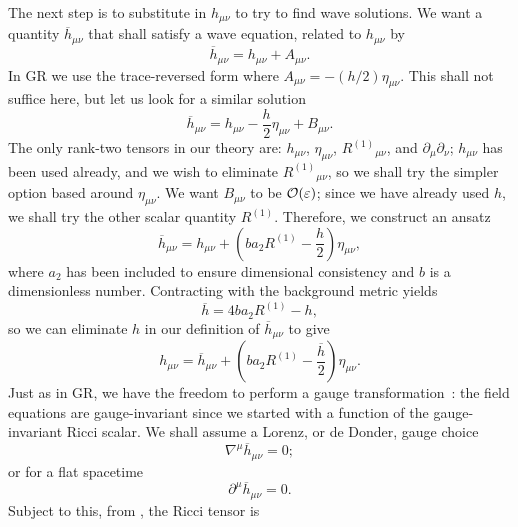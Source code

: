 The next step is to substitute in $h_{\mu\nu}$ to try to find wave solutions. We want a quantity $\overline{h}_{\mu\nu}$ that shall satisfy a wave equation, related to $h_{\mu\nu}$ by
\begin{equation}
\overline{h}_{\mu\nu} = h_{\mu\nu} + A_{\mu\nu}.
\end{equation}
In GR we use the trace-reversed form where $A_{\mu\nu} = -(h/2)\eta_{\mu\nu}$. This shall not suffice here, but let us look for a similar solution
\begin{equation}
\overline{h}_{\mu\nu} = h_{\mu\nu} - \frac{h}{2}\eta_{\mu\nu} + B_{\mu\nu}.
\end{equation}
The only rank-two tensors in our theory are: $h_{\mu\nu}$, $\eta_{\mu\nu}$, ${R^{(1)}}_{\mu\nu}$, and $\partial_\mu\partial_\nu$; $h_{\mu\nu}$ has been used already, and we wish to eliminate ${R^{(1)}}_{\mu\nu}$, so we shall try the simpler option based around $\eta_{\mu\nu}$. We want $B_{\mu\nu}$ to be $\mathcal{O}({\varepsilon})$; since we have already used $h$, we shall try the other scalar quantity $R^{(1)}$. Therefore, we construct an ansatz
\begin{equation}
\overline{h}_{\mu\nu} = h_{\mu\nu} + \left(b a_2 R^{(1)} - \frac{h}{2}\right)\eta_{\mu\nu},
\label{eq:Ansatz}
\end{equation}
where $a_2$ has been included to ensure dimensional consistency and $b$ is a dimensionless number. Contracting with the background metric yields
\begin{equation}
\overline{h} = 4b a_2 R^{(1)} - h,
\label{eq:h_trace}
\end{equation}
so we can eliminate $h$ in our definition of $\overline{h}_{\mu\nu}$ to give
\begin{equation}
h_{\mu\nu} = \overline{h}_{\mu\nu} + \left(b a_2 R^{(1)} -\frac{\overline{h}}{2}\right)\eta_{\mu\nu}.
\end{equation}
Just as in GR, we have the freedom to perform a gauge transformation~\cite{Misner1973, Hobson2006}: the field equations are gauge-invariant since we started with a function of the gauge-invariant Ricci scalar. We shall assume a Lorenz, or de Donder, gauge choice
\begin{equation}
\nabla^\mu \overline{h}_{\mu\nu} = 0;
\end{equation}
or for a flat spacetime
\begin{equation}
\partial^\mu \overline{h}_{\mu\nu} = 0.
\label{eq:Lorenz}
\end{equation}
Subject to this, from , the Ricci tensor is
